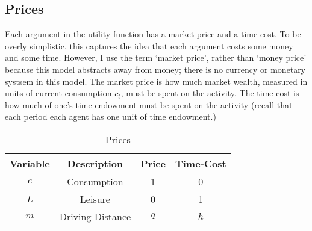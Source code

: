 \documentclass[letter, 12pt, epsf,leqno]{article}
\begin{document}
\subsection{Prices}

Each argument in the utility function has a market price and a time-cost.  To be overly simplistic, this captures the idea that each argument costs some money and some time.  However, I use the term `market price', rather than `money price' because this model abstracts away from money; there is no currency or monetary systsem in this model.  The market price is how much market wealth, measured in units of current consumption $c_t$, must be spent on the activity.  The time-cost is how much of one's time endowment must be spent on the activity (recall that each period each agent has one unit of time endowment.)  


\noindent
\begin{table}[!h]

\centering
\begin{threeparttable}


\begin{tabular}{cccc}
\toprule
{Variable} & {Description} & {Price} & {Time-Cost}\\
\midrule
$c$ &  Consumption & 1 & 0\\
\addlinespace
$L$ & Leisure & 0 & 1\\
\addlinespace
$m$ & Driving Distance & $q$ & $h$\\
\bottomrule
\end{tabular}
\caption{Prices}
\label{table:prices}
\end{threeparttable}
\end{table}
\end{document}
